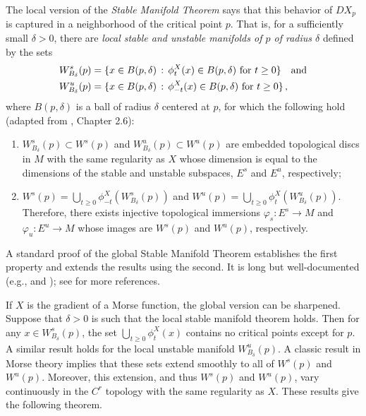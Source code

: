 \documentclass[12pt]{article}
\begin{document}
The local version of the \textit{Stable Manifold Theorem} says that this behavior of $DX_p$ is captured in a neighborhood of the critical point $p$. That is, for a sufficiently small $\delta > 0$, there are \textit{local stable and unstable manifolds of $p$ of radius $\delta$} defined by the sets
\begin{equation*}
    \begin{split}
    W_{B_{\delta}}^s(p) &= \{x \in B(p,\delta) \, : \, \phi^X_t(x) \in B(p,\delta) \textnormal{ for }t \geq 0 \}  \hspace{1em }\text{and}\\
    W_{B_{\delta}}^u(p) &= \{x \in B(p,\delta) \, : \, \phi^X_{-t}(x) \in B(p,\delta) \textnormal{ for }t \geq 0 \} \, ,
\end{split}
\end{equation*}
\noindent
where $B(p,\delta)$ is a ball of radius $\delta$ centered at $p$, for which the following hold (adapted from \cite{palis2012geometric}, Chapter 2.6):
\begin{enumerate}
    \item $W_{B_{\delta}}^s(p) \subset W^s(p)$ and $W_{B_{\delta}}^u(p) \subset W^u(p)$ are embedded topological discs in $M$ with the same regularity as $X$ whose dimension is equal to the dimensions of the stable and unstable subspaces, $E^s$ and $E^u$, respectively;
    \item $W^s(p) = \bigcup_{t\geq0}\phi_{-t}^X(W_{B_{\delta}}^s(p))$ and $W^u(p) = \bigcup_{t\geq0}\phi_{t}^X(W_{B_{\delta}}^u(p))$. Therefore, there exists injective topological immersions $\varphi_s:E^s \rightarrow M$ and $\varphi_u:E^u \rightarrow M$ whose images are $W^s(p)$ and $W^u(p)$, respectively. 
\end{enumerate}
A standard proof of the global Stable Manifold Theorem establishes the first property and extends the results using the second. It is long but well-documented (e.g., \cite{palis2012geometric} and \cite{shub2013global}); see \cite{smale1967differentiable} for more references. 

If $X$ is the gradient of a Morse function, the global version can be sharpened. Suppose that $\delta > 0$ is such that the local stable manifold theorem holds. Then for any $x \in W_{B_{\delta}}^s(p)$, the set $\bigcup_{t\geq0}\phi_{t}^X(x)$ contains no critical points except for $p$. A similar result holds for the local unstable manifold $W_{B_{\delta}}^u(p)$. A classic result in Morse theory implies that these sets extend smoothly to all of $W^s(p)$ and $W^u(p)$. Moreover, this extension, and thus $W^s(p)$ and $W^u(p)$, vary continuously in the $C^r$ topology with the same regularity as $X$. These results give the following theorem.
\end{document}
